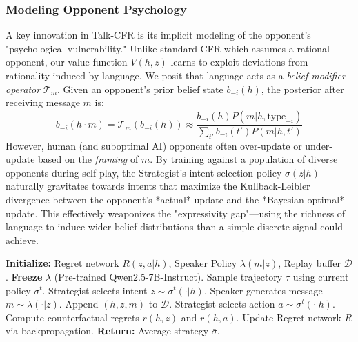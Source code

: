 \documentclass{article}
\begin{document}
\subsubsection{Modeling Opponent Psychology}
A key innovation in Talk-CFR is its implicit modeling of the opponent's "psychological vulnerability." Unlike standard CFR which assumes a rational opponent, our value function $V(h, z)$ learns to exploit deviations from rationality induced by language.
We posit that language acts as a \textit{belief modifier operator} $\mathcal{T}_m$. Given an opponent's prior belief state $b_{-i}(h)$, the posterior after receiving message $m$ is:
\begin{equation}
    b_{-i}(h \cdot m) = \mathcal{T}_m(b_{-i}(h)) \approx \frac{b_{-i}(h) P(m | h, \text{type}_{-i})}{\sum_{t'} b_{-i}(t') P(m | h, t')}
\end{equation}
However, human (and suboptimal AI) opponents often over-update or under-update based on the \textit{framing} of $m$. By training against a population of diverse opponents during self-play, the Strategist's intent selection policy $\sigma(z|h)$ naturally gravitates towards intents that maximize the Kullback-Leibler divergence between the opponent's *actual* update and the *Bayesian optimal* update. This effectively weaponizes the "expressivity gap"—using the richness of language to induce wider belief distributions than a simple discrete signal could achieve.

\begin{algorithm}[t]
\caption{Talk-CFR Training Loop}
\label{alg:talk_cfr}
\begin{algorithmic}[1]
\STATE \textbf{Initialize:} Regret network $R(z, a | h)$, Speaker Policy $\lambda(m|z)$, Replay buffer $\mathcal{D}$.
\STATE \textbf{Freeze} $\lambda$ (Pre-trained Qwen2.5-7B-Instruct).
    \STATE Sample trajectory $\tau$ using current policy $\sigma^t$.
        \STATE Strategist selects intent $z \sim \sigma^t(\cdot | h)$.
        \STATE Speaker generates message $m \sim \lambda(\cdot | z)$.
        \STATE Append $(h, z, m)$ to $\mathcal{D}$.
    \ELSE
        \STATE Strategist selects action $a \sim \sigma^t(\cdot | h)$.
    \ENDIF
    \STATE Compute counterfactual regrets $r(h, z)$ and $r(h, a)$.
    \STATE Update Regret network $R$ via backpropagation.
\ENDFOR
\STATE \textbf{Return:} Average strategy $\bar{\sigma}$.
\end{algorithmic}
\end{algorithm}
\end{document}
